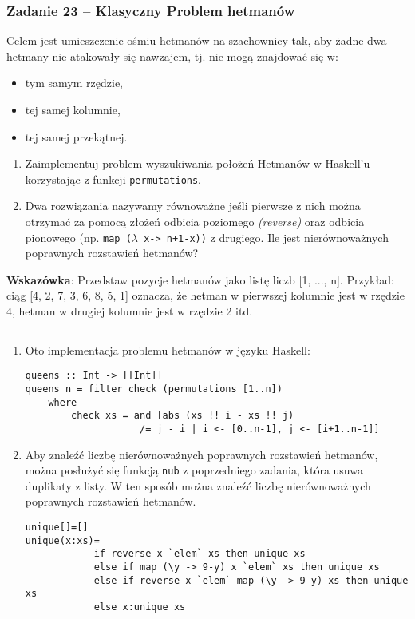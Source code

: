 \documentclass[11pt,a4paper]{article}
\begin{document}
\subsubsection{Zadanie 23 -- Klasyczny Problem hetmanów}
Celem jest umieszczenie ośmiu hetmanów na szachownicy tak, aby żadne dwa hetmany nie atakowały się nawzajem, tj. nie mogą znajdować się w:
\begin{itemize}
    \item tym samym rzędzie,
    \item tej samej kolumnie,
    \item tej samej przekątnej.
\end{itemize}
\begin{enumerate}
    \item Zaimplementuj problem wyszukiwania położeń Hetmanów w Haskell’u korzystając z funkcji \texttt{permutations}.
    \item Dwa rozwiązania nazywamy równoważne jeśli pierwsze z nich można otrzymać za pomocą złożeń odbicia poziomego \textit{(reverse)} oraz odbicia pionowego (np. \texttt{map ($\lambda$ x-> n+1-x))} z drugiego. Ile jest nierównoważnych poprawnych rozstawień hetmanów?
\end{enumerate}
\textbf{Wskazówka}: Przedstaw pozycje hetmanów jako listę liczb [1, ..., n]. Przykład: ciąg [4, 2, 7, 3, 6, 8, 5, 1] oznacza, że hetman w pierwszej kolumnie jest w rzędzie 4, hetman w drugiej kolumnie jest w rzędzie 2 itd.

\bigskip
\hrule
\bigskip

\begin{enumerate}
    \item Oto implementacja problemu hetmanów w języku Haskell:
        \begin{Verbatim}[frame=single]
queens :: Int -> [[Int]]
queens n = filter check (permutations [1..n])
    where
        check xs = and [abs (xs !! i - xs !! j)
                    /= j - i | i <- [0..n-1], j <- [i+1..n-1]]
        \end{Verbatim}
    \item Aby znaleźć liczbę nierównoważnych poprawnych rozstawień hetmanów, można posłużyć się funkcją \texttt{nub} z poprzedniego zadania, która usuwa duplikaty z listy. W ten sposób można znaleźć liczbę nierównoważnych poprawnych rozstawień hetmanów.
        \begin{Verbatim}[frame=single]
unique[]=[]
unique(x:xs)=
            if reverse x `elem` xs then unique xs
            else if map (\y -> 9-y) x `elem` xs then unique xs
            else if reverse x `elem` map (\y -> 9-y) xs then unique xs
            else x:unique xs
        \end{Verbatim}
\end{enumerate}
\end{document}
